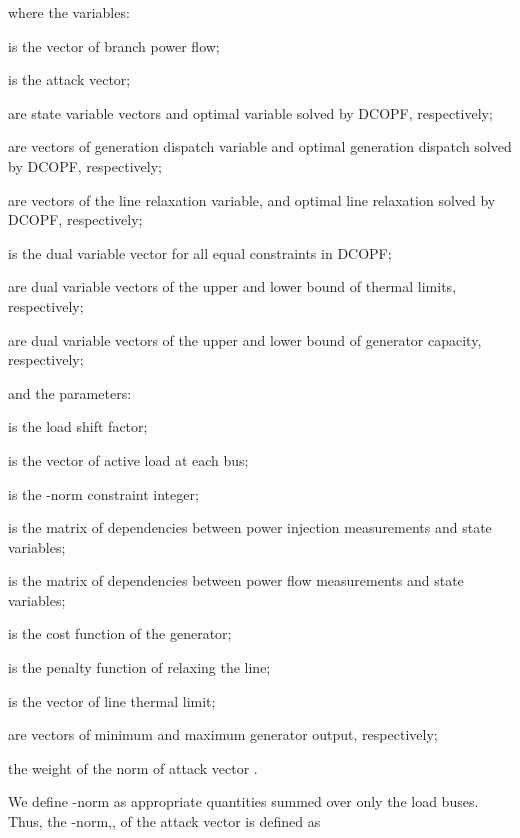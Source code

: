 \documentclass[twocolumn,english,final,journal]{IEEEtran}
\theoremstyle{plain}
\theoremstyle{definition}
\begin{document}
where the variables:
\begin{description}[leftmargin=1.8cm,style=multiline]
\item[] is the  vector of branch power flow;
\item[] is the  attack vector;
\item[] are  state variable vectors and optimal variable solved
by DCOPF, respectively;
\item[] are  vectors of generation dispatch variable and optimal
generation dispatch solved by DCOPF, respectively;
\item[] are  vectors of the line relaxation variable, and
optimal line relaxation solved by DCOPF, respectively;
\item[] is the  dual variable vector for all equal constraints
in DCOPF;
\item[] are  dual variable vectors of the upper and lower
bound of thermal limits, respectively;
\item[] are  dual variable vectors of the upper and lower bound
of generator capacity, respectively;
\end{description}
and the parameters:
\begin{description}[leftmargin=1.8cm,style=multiline]
\item[] is the load shift factor;
\item[] is the  vector of active load at each bus;
\item[] is the -norm constraint integer;
\item[] is the  matrix of dependencies between power injection
measurements and state variables;
\item[] is the  matrix of dependencies between power
flow measurements and state variables;
\item[] is the cost function of the  generator;
\item[]  is the penalty function of relaxing the  line;
\item[] is the  vector of line thermal limit;
\item[] are  vectors of minimum and maximum generator output,
respectively;
\item[] the weight of the norm of attack vector .
\end{description}

We define -norm as appropriate quantities summed over
only the load buses. Thus, the -norm,,
of the attack vector  is defined as
\end{document}
